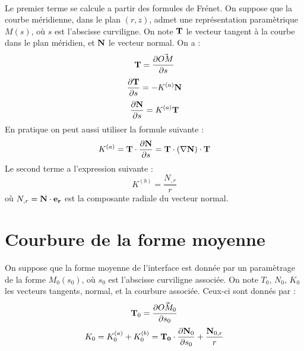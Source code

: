 \documentclass[a4paper]{report}
\newcommand\DP[2]{\frac{\partial #1}{\partial #2}}
\begin{document}
\\
Le premier terme se calcule a partir des formules de Frénet. On suppose que la courbe méridienne, dans le plan $(r,z)$, admet une représentation paramètrique $M(s)$, où $s$ est l'abscisse curviligne. On note $\bf T$ le vecteur tangent à la courbe dans le plan méridien, et $\bf N$ le vecteur normal. On a :
$$
{\bf T} = \DP{\vec{OM}}{s}
$$
$$
\DP{{\bf T}}{s} = - K^{(a)} {\bf N}
$$
$$
\DP{{\bf N}}{s} = K^{(a)} {\bf T}
$$
En pratique on peut aussi utiliser la formule suivante :
$$
K^{(a)} =  {\bf T} \cdot \DP{{\bf N}}{s} =   {\bf T} \cdot (\nabla {\bf N}) \cdot {\bf T} 
$$
Le second terme a l'expression suivante :
$$
K^{(b)} =  \frac{ N_{,r}}{r}
$$
où $N_{,r} = {\bf N} \cdot {\bf e_r}$ est la composante radiale du vecteur normal.
\section{Courbure de la forme moyenne}
On suppose que la forme moyenne de l'interface est donnée par un paramètrage de la forme $M_0(s_0)$, où $s_0$ est l'abscisse curviligne associée. On note $T_0$, $N_0$, $K_0$ les vecteurs tangents, normal, et la courbure associée. Ceux-ci sont donnés par :
$$
{\bf T}_0 = \DP{\vec{OM_0}}{s_0}
$$
\begin{equation}
K_0 = K_0^{(a)} + K_0^{(b)} =  {\bf T_0} \cdot \DP{{\bf N}_0}{s_0} 
+ \frac{{\bf N}_{0,r}}{r}
\end{equation}
\end{document}
